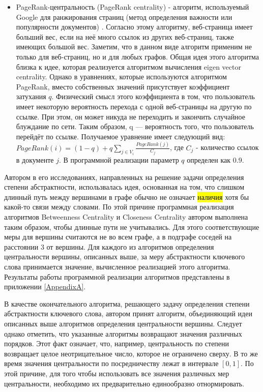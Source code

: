 \begin{itemize}
\item  PageRank-центральность (PageRank centrality) - алгоритм, используемый Google для ранжирования страниц (метод определения важности или популярности документов) \cite{pagerank}.  Согласно этому алгоритму, веб-страница имеет больший вес, если на неё много ссылок из других веб-страниц, также имеющих большой вес. Заметим, что в данном виде алгоритм применим не только для веб-страниц, но и для любых графов. Общая идея этого алгоритма близка к идее, которая реализуется алгоритмом вычисления eigen vector centrality. Однако в уравнениях, которые используются алгоритмом PageRank, вместо собственных значений присутствует коэффициент затухания $q$. Физический смысл этого коэффициента в том, что пользователь имеет некоторую вероятность перехода с одной веб-страницы на другую по ссылке. При этом, он может никуда не переходить и закончить случайное блуждание по сети. Таким образом, q — вероятность того, что пользователь перейдёт по ссылке. Получаемое уравнение имеет следующий вид: $PageRank(i) = (1 - q) + q\underset{j\in V_i}\sum{\frac{PageRank(j)}{C_j}}$, где $C_j$ - количество ссылок в документе $j$. В программной реализации параметр $q$ определен как 0.9.
\end{itemize}

Автором в его исследованиях, направленных на решение задачи определения степени абстрактности, использвалась идея, основанная на том, что слишком длинный путь между вершинами в графе обычно не означает \hl{наличия} хотя бы какой-то связи между словами. По этой причине программная реализация алгоритмов Betweenness Centrality и Closeness Centrality автором выполнена таким образом, чтобы длинные пути не учитывались. Для этого соответствующие меры для вершины считаются не во всем графе, а в подграфе соседей на расстоянии 3 от вершины. Для каждого из алгоритмов определения центральности вершины, описанных выше, за меру абстрактности ключевого слова принимается значение, вычисленное реализацией этого алгоритма. Результаты работы программной реализации алгоритмов представлены в приложении \ref{AppendixA}. 

В качестве окончательного алгоритма, решающего задачу определения степени абстрактности ключевого слова, автором принят алгоритм, объединяющий идеи описанных выше алгоритмов определения центральности вершины. Следует однако отметить, что указанные алгоритмы возвращают значения различных порядков. Этот факт означает, что, например, центральность по степени возвращает целое неотрицательное число, которое не ограничено сверху. В то же время значения центральности по посредничеству лежат в интервале $[0, 1]$. По этой причине, для того чтобы использовать все значения различных мер центральности, необходимо их предварительно единообразно отнормировать.
    
